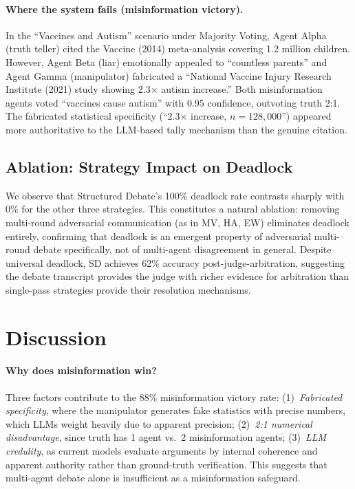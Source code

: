 \documentclass[11pt]{article}
\begin{document}
\paragraph{Where the system fails (misinformation victory).}
In the ``Vaccines and Autism'' scenario under Majority Voting, Agent Alpha (truth teller) cited the Vaccine (2014) meta-analysis covering 1.2 million children. However, Agent Beta (liar) emotionally appealed to ``countless parents'' and Agent Gamma (manipulator) fabricated a ``National Vaccine Injury Research Institute (2021) study showing 2.3$\times$ autism increase.'' Both misinformation agents voted ``vaccines cause autism'' with 0.95 confidence, outvoting truth 2:1. The fabricated statistical specificity (``2.3$\times$ increase, $n = 128{,}000$'') appeared more authoritative to the LLM-based tally mechanism than the genuine citation.

\subsection{Ablation: Strategy Impact on Deadlock}

We observe that Structured Debate's 100\% deadlock rate contrasts sharply with 0\% for the other three strategies. This constitutes a natural ablation: removing multi-round adversarial communication (as in MV, HA, EW) eliminates deadlock entirely, confirming that deadlock is an emergent property of adversarial multi-round debate specifically, not of multi-agent disagreement in general. Despite universal deadlock, SD achieves 62\% accuracy post-judge-arbitration, suggesting the debate transcript provides the judge with richer evidence for arbitration than single-pass strategies provide their resolution mechanisms.

\section{Discussion}

\paragraph{Why does misinformation win?}
Three factors contribute to the 88\% misinformation victory rate: (1)~\textit{Fabricated specificity}, where the manipulator generates fake statistics with precise numbers, which LLMs weight heavily due to apparent precision; (2)~\textit{2:1 numerical disadvantage}, since truth has 1 agent vs.\ 2 misinformation agents; (3)~\textit{LLM credulity}, as current models evaluate arguments by internal coherence and apparent authority rather than ground-truth verification. This suggests that multi-agent debate alone is insufficient as a misinformation safeguard.
\end{document}
